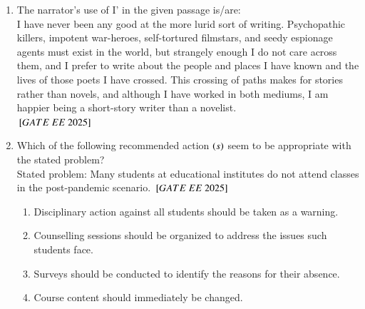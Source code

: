 \documentclass[journal,12pt,onecolumn]{IEEEtran}
\theoremstyle{remark}
\begin{document}
\begin{enumerate}
  \item The narrator's use of I' in the given passage is/are: \\   
 I have never been any good at the more lurid sort of writing. Psychopathic killers, impotent war-heroes, self-tortured filmstars, and seedy espionage agents must exist in the world, but strangely enough I do not care across them, and I prefer to write about the people and places I have known and the lives of those poets I have crossed. This crossing of paths makes for stories rather than novels, and although I have worked in both mediums, I am happier being a short-story writer than a novelist.\\

\hfill ${}\left[GATE\ EE\ 2025\right]$
    \begin{enumerate}
      \end{enumerate}

  \item Which of the following recommended action $\left(s\right)$ seem to be appropriate with the stated problem?  \\  
      Stated problem: Many students at educational institutes do not attend classes in the post-pandemic scenario.  
     \hfill ${}\left[GATE\ EE\ 2025\right]$
    \begin{enumerate}
    
  \item Disciplinary action against all students should be taken as a warning.   
  \item Counselling sessions should be organized to address the issues such students face.
  \item Surveys should be conducted to identify the reasons for their absence.
  \item Course content should immediately be changed.
   \end{enumerate}


\end{enumerate}
\end{document}
